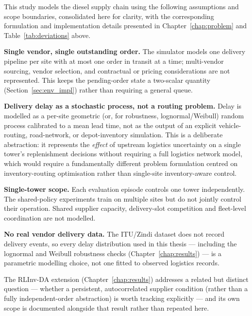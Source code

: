 This study models the diesel supply chain using the following
assumptions and scope boundaries, consolidated here for clarity, with
the corresponding formulation and implementation details presented in
Chapter~\ref{chap:problem} and Table~\ref{tab:deviations} above.

\textbf{Single vendor, single outstanding order.} The simulator models
one delivery pipeline per site with at most one order in transit at a
time; multi-vendor sourcing, vendor selection, and contractual or
pricing considerations are not represented. This keeps the pending-order
state a two-scalar quantity (Section~\ref{sec:env_impl}) rather than
requiring a general queue.

\textbf{Delivery delay as a stochastic process, not a routing problem.}
Delay is modelled as a per-site geometric (or, for robustness,
lognormal/Weibull) random process calibrated to a mean lead time, not as
the output of an explicit vehicle-routing, road-network, or
depot-inventory simulation. This is a deliberate abstraction: it
represents the \emph{effect} of upstream logistics uncertainty on a
single tower's replenishment decisions without requiring a full
logistics network model, which would require a fundamentally different
problem formulation centred on inventory-routing optimisation rather
than single-site inventory-aware control.

\textbf{Single-tower scope.}
Each evaluation episode controls one tower independently.
The shared-policy experiments train on multiple sites
but do not jointly control their operation. Shared
supplier capacity, delivery-slot competition and
fleet-level coordination are not modelled.

\textbf{No real vendor delivery data.} The ITU/Zindi dataset does not
record delivery events, so every delay distribution used in this thesis
--- including the lognormal and Weibull robustness checks
(Chapter~\ref{chap:results}) --- is a parametric modelling choice, not
one fitted to observed logistics records. 

The RLInv-DA extension (Chapter~\ref{chap:results}) addresses a related
but distinct question --- whether a persistent, autocorrelated supplier
condition (rather than a fully independent-order abstraction) is
worth tracking explicitly --- and its own scope is documented alongside
that result rather than repeated here.